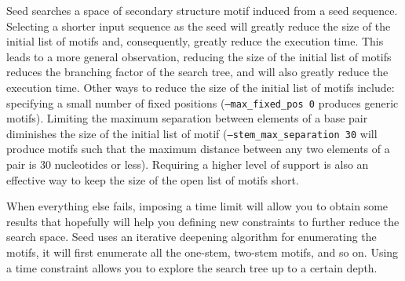 \documentclass{article}
\begin{document}
Seed searches a space of secondary structure motif induced from a
seed sequence.  Selecting a shorter input sequence as the seed will greatly
reduce the size of the initial list of motifs and, consequently,
greatly reduce the execution time. This leads to a more general
observation, reducing the size of the initial list of motifs reduces
the branching factor of the search tree, and will also greatly reduce
the execution time. Other ways to reduce the size of the initial list
of motifs include: specifying a small number of fixed positions
(\texttt{--max\_fixed\_pos 0} produces generic motifs).  Limiting the
maximum separation between elements of a base pair diminishes the size
of the initial list of motif (\texttt{--stem\_max\_separation 30} will
produce motifs such that the maximum distance between any two elements
of a pair is 30 nucleotides or less). Requiring a higher level of
support is also an effective way to keep the size of the open list of
motifs short.

When everything else fails, imposing a time limit will allow you to
obtain some results that hopefully will help you defining new
constraints to further reduce the search space.  Seed uses an iterative
deepening algorithm for enumerating the motifs, it will first
enumerate all the one-stem, two-stem motifs, and so on.  Using a time
constraint allows you to explore the search tree up to a certain depth.

% 


\newpage



\end{document}
